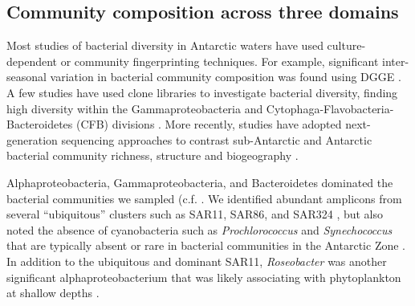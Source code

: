 \subsection{Community composition across three domains}\label{ssc:community}

Most studies of bacterial diversity in Antarctic waters have used culture-dependent or community fingerprinting techniques. For example, significant inter-seasonal variation in bacterial community composition was found using DGGE \citep{mpmtbwd98,mg07}. A few studies have used clone libraries to investigate bacterial diversity, finding high diversity within the Gammaproteobacteria and Cytophaga-Flavobacteria-Bacteroidetes (CFB) divisions \citep{ggdsad06,Piquet2011-ot}. More recently, studies have adopted next-generation sequencing approaches to contrast sub-Antarctic and Antarctic bacterial community richness, structure and biogeography \citep{Ghiglione2012-qm, wlwdbhamrrc13, wvrlc13}.

Alphaproteobacteria, Gammaproteobacteria, and Bacteroidetes dominated the bacterial communities we sampled (c.f. \citet{ggdsad06, pcrbslth07, Piquet2011-ot,Ghiglione2012-qm, wlwdbhamrrc13, wvrlc13}. We identified abundant amplicons from several ``ubiquitous'' clusters such as SAR11, SAR86, and SAR324 \citep{pph05}, but also noted the absence of cyanobacteria such as \textit{Prochlorococcus} and \textit{Synechococcus} that are typically absent or rare in bacterial communities in the Antarctic Zone \citep{wlwdbhamrrc13,wywabdlc13}. In addition to the ubiquitous and dominant SAR11, \textit{Roseobacter} was another significant alphaproteobacterium that was likely associating with phytoplankton at shallow depths \citep{Ghiglione2012-qm,wlwdbhamrrc13,wywabdlc13}.

